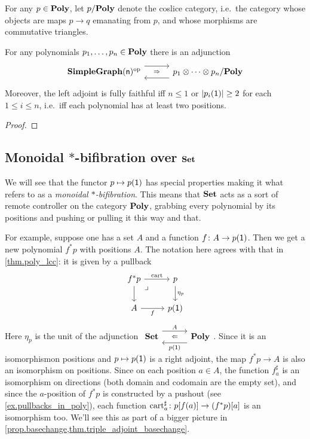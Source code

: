 \documentclass[Book-Poly]{subfiles}
\begin{document}
For any $p\in\textbf{Poly}$, let $p/\textbf{Poly}$ denote the coslice category, i.e.\ the category whose objects are maps $p\to q$ emanating from $p$, and whose morphisms are commutative triangles.

\begin{proposition}
For any polynomials $p_1,\ldots,p_n\in\textbf{Poly}$ there is an adjunction
\[
	\adj
		{\Cat{SimpleGraph}(\ord{n})\op}
		{}{}
		{p_1\otimes\cdots\otimes p_n/\poly}
\]
Moreover, the left adjoint is fully faithful iff $n\leq 1$ or $|p_i(\textsf{1})|\geq 2$ for each $1\leq i\leq n$, i.e.\ iff each polynomial has at least two positions.
\end{proposition}
\begin{proof}

\end{proof}



\subsection{Monoidal $*$-bifibration over $\textbf{Set}$}

We will see that the functor $p\mapsto p(\textsf{1})$ has special properties making it what
\cite{shulman2008framed} refers to as a \emph{monoidal $*$-bifibration}. This means that $\textbf{Set}$ acts as a sort of remote controller on the category $\textbf{Poly}$, grabbing every polynomial by its positions and pushing or pulling it this way and that. 

For example, suppose one has a set $A$ and a function $f\colon A\to p(\textsf{1})$. Then we get a new polynomial $f^*p$ with positions $A$. The notation here agrees with that in \cref{thm.poly_lcc}: it is given by a pullback
\begin{equation}\label{eqn.f^*_defined}
\begin{tikzcd}
	f^*p\ar[r, "\fun{cart}"]\ar[d]&
	p\ar[d, "\eta_p"]\\
	A\ar[r, "f"']&
	p(\1)\ar[ul, phantom, very near end, "\lrcorner"]
\end{tikzcd}
\end{equation}
Here $\eta_p$ is the unit of the adjunction $\adjr{\smset}{A}{p(\1)}{\poly}$. Since it is an isomorphismon positions and $p\mapsto p(\textsf{1})$ is a right adjoint, the map $f^*p\to A$ is also an isomorphism on positions. Since on each position $a\in A$, the function $f^\sharp_a$ is an isomorphism on directions (both domain and codomain are the empty set), and since the $a$-position of $f^*p$ is constructed by a pushout (see \cref{ex.pullbacks_in_poly}), each function $\mathrm{cart}_a^\sharp\colon p[f(a)]\to(f^*p)[a]$ is an isomorphism too. We'll see this as part of a bigger picture in \cref{prop.basechange,thm.triple_adjoint_basechange}.
\end{document}
